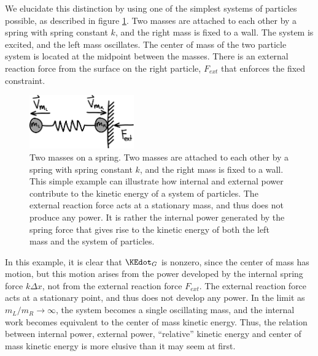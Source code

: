We elucidate this distinction by using one of the simplest systems of particles possible, as described in figure \ref{fig:ParticleExplosion}. Two masses are attached to each other by a spring with spring constant $k$, and the right mass is fixed to a wall. The system is excited, and the left mass oscillates. The center of mass of the two particle system is located at the midpoint between the masses. There is an external reaction force from the surface on the right particle, $F_{ext}$ that enforces the fixed constraint.

\begin{figure}[h]		%
\begin{centering}
\includegraphics[width=0.4\textwidth]{Figures/ParticleExplosion}\par
\end{centering}
\caption[Diagram: Two Masses on a Spring]{Two masses on a spring. Two masses are attached to each other by a spring with spring constant $k$, and the right mass is fixed to a wall. This simple example can illustrate how  internal and external power contribute to the kinetic energy of a system of particles. The external reaction force acts at a stationary mass, and thus does not produce any power. It is rather the internal power generated by the spring force that gives rise to the kinetic energy of both the left mass and the system of particles.}
\label{fig:ParticleExplosion}
\end{figure}
%

In this example, it is clear that $\KEdot_{G}$ is nonzero, since the center of mass has motion, but this motion arises from the power developed by the internal spring force $k\Delta x$, not from the external reaction force $F_{ext}$. The external reaction force acts at a stationary point, and thus does not develop any power. In the limit as $m_L/m_R \rightarrow \infty$, the system becomes a single oscillating mass, and the internal work becomes equivalent to the center of mass kinetic energy. Thus, the relation between internal power, external power, ``relative'' kinetic energy and center of mass kinetic energy is more elusive than it may seem at first.


